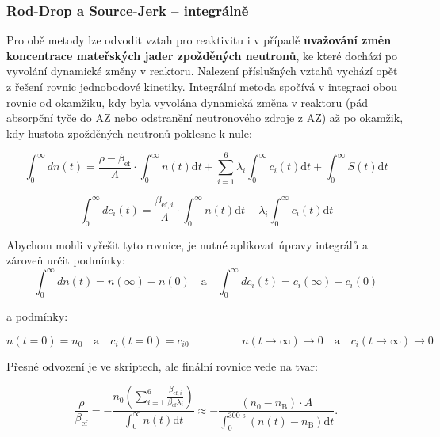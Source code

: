 \subsubsection{Rod-Drop a Source-Jerk -- integrálně}

Pro obě metody lze odvodit vztah pro reaktivitu i v případě \textbf{uvažování změn koncentrace mateřských jader zpožděných neutronů}, ke které dochází po vyvolání dynamické změny v reaktoru. Nalezení příslušných vztahů vychází opět z řešení rovnic jednobodové kinetiky. Integrální metoda spočívá v integraci obou rovnic od okamžiku, kdy byla vyvolána dynamická změna v reaktoru (pád absorpční tyče do AZ nebo odstranění neutronového zdroje z AZ) až po okamžik, kdy hustota zpožděných neutronů poklesne k nule:

\begin{equation*}
    \int_0^\infty d n(t)= \dfrac{\rho - \beta_{\text{ef}}}{\Lambda}\cdot \int_0^\infty n(t) \text{d}t + \sum_{i=1}^6 \lambda_i \int_0^\infty c_i(t) \text{d}t + \int_0^\infty S(t) \text{d}t 
\end{equation*}

\begin{equation*}
    \int_0^\infty dc_i(t) = \frac{\beta_{\text{ef}, i}}{\Lambda}\cdot \int_0^\infty n(t) \text{d}t - \lambda_i \int_0^\infty c_i(t) \text{d}t
\end{equation*}

Abychom mohli vyřešit tyto rovnice, je nutné aplikovat úpravy integrálů a zároveň určit podmínky:
\begin{equation*}
\int_0^\infty dn(t) = n(\infty) - n(0) \quad \text{a} \quad \int_0^\infty dc_i(t) = c_i(\infty) - c_i(0) 
\end{equation*}

a podmínky:

\begin{equation*}
n(t=0) = n_0 \quad \text{a} \quad c_i(t=0) = c_{i0} \hspace{2cm} n(t \to \infty) \to 0 \quad \text{a} \quad c_i(t \to \infty) \to 0 
\end{equation*}

Přesné odvození je ve skriptech, ale finální rovnice vede na tvar:

\begin{equation}
\boxed{ \frac{\rho}{\beta_{\text{ef}}} = -\frac{n_0 \left( \sum_{i=1}^6 \frac{\beta_{\text{ef},i}}{\beta_{\text{ef}} \lambda_i} \right)}{\int_0^\infty n(t) \text{d}t} \approx -\frac{(n_0-n_\text{B}) \cdot A}{\int_0^{300\text{ s}} \left( n(t)-n_\text{B}\right) \text{d}t}.}
\end{equation}

